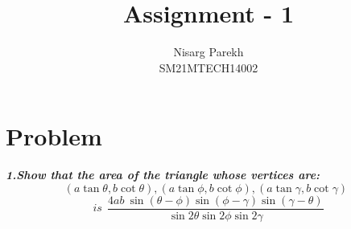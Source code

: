 \documentclass[journal,12pt,twocolumn]{IEEEtran}
\begin{document}
\providecommand{\sbrak}[1]{\ensuremath{{}\left[#1\right]}}
\providecommand{\lsbrak}[1]{\ensuremath{{}\left[#1\right.}}
\providecommand{\rsbrak}[1]{\ensuremath{{}\left.#1\right]}}
\providecommand{\brak}[1]{\ensuremath{\left(#1\right)}}
\providecommand{\lbrak}[1]{\ensuremath{\left(#1\right.}}
\providecommand{\rbrak}[1]{\ensuremath{\left.#1\right)}}
\providecommand{\cbrak}[1]{\ensuremath{\left\{#1\right\}}}
\providecommand{\lcbrak}[1]{\ensuremath{\left\{#1\right.}}
\providecommand{\rcbrak}[1]{\ensuremath{\left.#1\right\}}}
\newcommand{\myvec}[1]{\ensuremath{\begin{pmatrix}#1\end{pmatrix}}}
\newcommand{\cmyvec}[1]{\ensuremath{\begin{pmatrix*}[c]#1\end{pmatrix*}}}
\newcommand{\mydet}[1]{\ensuremath{\begin{vmatrix}#1\end{vmatrix}}}
\newcommand{\proj}[2]{\textbf{proj}_{\vec{#1}}\vec{#2}}
\let\StandardTheFigure\thefigure
\let\vec\mathbf

\title{
Assignment - 1
}
\author{ Nisarg Parekh \\SM21MTECH14002}
\maketitle
\newpage
\bigskip

\section*{\textbf{Problem}}
\noindent
\textbf{\textsl{1.Show that the area of the triangle whose vertices are:
$$(a \tan\theta, b\cot\theta),(a \tan \phi, b\cot \phi),(a \tan \gamma, b\cot \gamma)~~$$
$$ is~~  \frac{4ab~\sin(\theta-\phi)\sin(\phi-\gamma)\sin(\gamma-\theta)}{\sin2\theta\sin2\phi\sin2\gamma}$$ }}



\noindent
\end{document}
